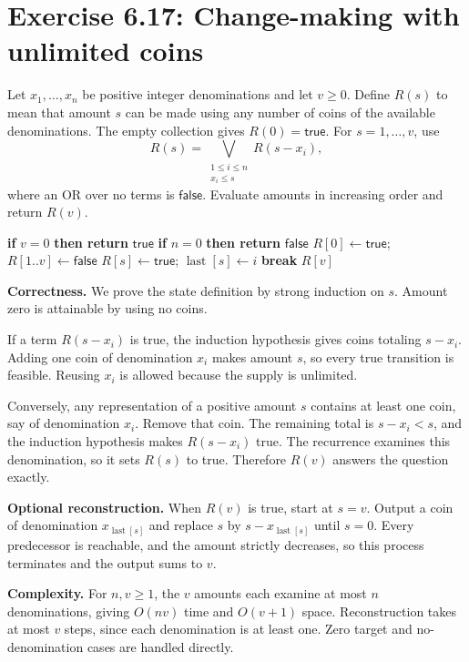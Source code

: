 \documentclass[11pt]{article}
\newcommand{\True}{\mathsf{true}}
\newcommand{\False}{\mathsf{false}}
\newcommand{\exercise}[2]{\section*{Exercise #1: #2}}
\begin{document}
\newpage
\exercise{6.17}{Change-making with unlimited coins}
Let $x_1,\ldots,x_n$ be positive integer denominations and let $v\ge0$.
Define $R(s)$ to mean that amount $s$ can be made using any number of
coins of the available denominations. The empty collection gives
$R(0)=\True$. For $s=1,\ldots,v$, use
\[
 \boxed{R(s)=\bigvee_{\substack{1\le i\le n\\x_i\le s}}R(s-x_i),}
\]
where an OR over no terms is $\False$.
Evaluate amounts in increasing order and return $R(v)$.

\begin{algorithm}[H]
\caption{Unlimited-coin change-making}
\begin{algorithmic}[1]
 \State \textbf{if} $v=0$ \textbf{then return} $\True$
 \State \textbf{if} $n=0$ \textbf{then return} $\False$
 \State $R[0]\gets\True$; $R[1..v]\gets\False$
    \State $R[s]\gets\True$; $\operatorname{last}[s]\gets i$
    \State \textbf{break}
   \EndIf
  \EndFor
 \EndFor
 \State \Return $R[v]$
\EndFunction
\end{algorithmic}
\end{algorithm}

\textbf{Correctness.}
We prove the state definition by strong induction on $s$.
Amount zero is attainable by using no coins.

If a term $R(s-x_i)$ is true, the induction hypothesis gives coins
totaling $s-x_i$. Adding one coin of denomination $x_i$ makes amount
$s$, so every true transition is feasible. Reusing $x_i$ is allowed
because the supply is unlimited.

Conversely, any representation of a positive amount $s$ contains at
least one coin, say of denomination $x_i$. Remove that coin. The
remaining total is $s-x_i<s$, and the induction hypothesis makes
$R(s-x_i)$ true. The recurrence examines this denomination, so it sets
$R(s)$ to true. Therefore $R(v)$ answers the question exactly.

\textbf{Optional reconstruction.}
When $R(v)$ is true, start at $s=v$. Output a coin of denomination
$x_{\operatorname{last}[s]}$ and replace $s$ by
$s-x_{\operatorname{last}[s]}$ until $s=0$.
Every predecessor is reachable, and the amount strictly decreases, so
this process terminates and the output sums to $v$.

\textbf{Complexity.}
For $n,v\ge1$, the $v$ amounts each examine at most $n$ denominations,
giving $\boxed{O(nv)}$ time and $O(v+1)$ space.
Reconstruction takes at most $v$ steps, since each denomination is at
least one. Zero target and no-denomination cases are handled directly.
\end{document}

